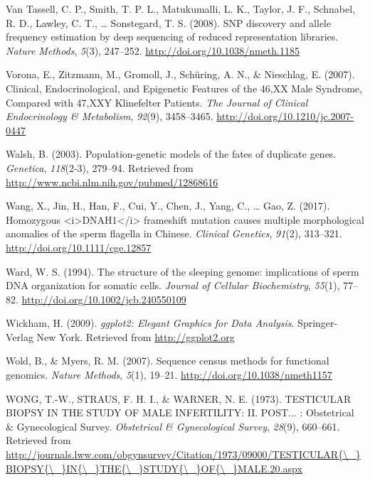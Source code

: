 \documentclass[12pt,twoside]{reedthesis}
\theoremstyle{definition}
\theoremstyle{definition}
\theoremstyle{remark}
\begin{document}
  \hypertarget{ref-VanTassell2008}{}
  Van Tassell, C. P., Smith, T. P. L., Matukumalli, L. K., Taylor, J. F.,
  Schnabel, R. D., Lawley, C. T., \ldots{} Sonstegard, T. S. (2008). SNP
  discovery and allele frequency estimation by deep sequencing of reduced
  representation libraries. \emph{Nature Methods}, \emph{5}(3), 247--252.
  \url{http://doi.org/10.1038/nmeth.1185}
  
  \hypertarget{ref-Vorona2007}{}
  Vorona, E., Zitzmann, M., Gromoll, J., Schüring, A. N., \& Nieschlag, E.
  (2007). Clinical, Endocrinological, and Epigenetic Features of the 46,XX
  Male Syndrome, Compared with 47,XXY Klinefelter Patients. \emph{The
  Journal of Clinical Endocrinology \& Metabolism}, \emph{92}(9),
  3458--3465. \url{http://doi.org/10.1210/jc.2007-0447}
  
  \hypertarget{ref-Walsh2003}{}
  Walsh, B. (2003). Population-genetic models of the fates of duplicate
  genes. \emph{Genetica}, \emph{118}(2-3), 279--94. Retrieved from
  \url{http://www.ncbi.nlm.nih.gov/pubmed/12868616}
  
  \hypertarget{ref-Wang2017}{}
  Wang, X., Jin, H., Han, F., Cui, Y., Chen, J., Yang, C., \ldots{} Gao,
  Z. (2017). Homozygous
  \textless{}i\textgreater{}DNAH1\textless{}/i\textgreater{} frameshift
  mutation causes multiple morphological anomalies of the sperm flagella
  in Chinese. \emph{Clinical Genetics}, \emph{91}(2), 313--321.
  \url{http://doi.org/10.1111/cge.12857}
  
  \hypertarget{ref-Ward1994}{}
  Ward, W. S. (1994). The structure of the sleeping genome: implications
  of sperm DNA organization for somatic cells. \emph{Journal of Cellular
  Biochemistry}, \emph{55}(1), 77--82.
  \url{http://doi.org/10.1002/jcb.240550109}
  
  \hypertarget{ref-Wickham2009}{}
  Wickham, H. (2009). \emph{ggplot2: Elegant Graphics for Data Analysis}.
  Springer-Verlag New York. Retrieved from \url{http://ggplot2.org}
  
  \hypertarget{ref-Wold2007}{}
  Wold, B., \& Myers, R. M. (2007). Sequence census methods for functional
  genomics. \emph{Nature Methods}, \emph{5}(1), 19--21.
  \url{http://doi.org/10.1038/nmeth1157}
  
  \hypertarget{ref-WONG1973}{}
  WONG, T.-W., STRAUS, F. H. I., \& WARNER, N. E. (1973). TESTICULAR
  BIOPSY IN THE STUDY OF MALE INFERTILITY: II. POST... : Obstetrical \&
  Gynecological Survey. \emph{Obstetrical \& Gynecological Survey},
  \emph{28}(9), 660--661. Retrieved from
  \href{http://journals.lww.com/obgynsurvey/Citation/1973/09000/TESTICULAR\%7B/_\%7DBIOPSY\%7B/_\%7DIN\%7B/_\%7DTHE\%7B/_\%7DSTUDY\%7B/_\%7DOF\%7B/_\%7DMALE.20.aspx}{http://journals.lww.com/obgynsurvey/Citation/1973/09000/TESTICULAR\{\textbackslash{}\_\}BIOPSY\{\textbackslash{}\_\}IN\{\textbackslash{}\_\}THE\{\textbackslash{}\_\}STUDY\{\textbackslash{}\_\}OF\{\textbackslash{}\_\}MALE.20.aspx}
  
\end{document}

